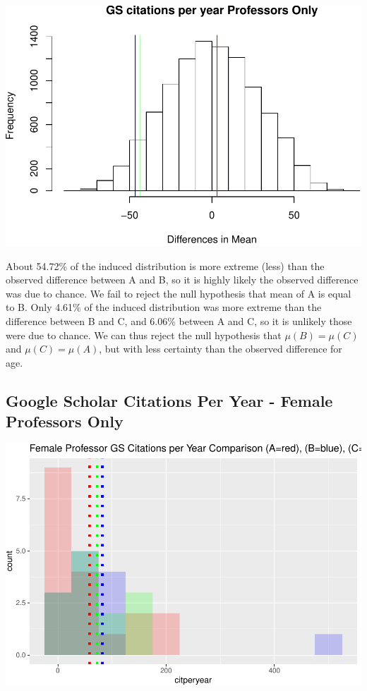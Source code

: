 \documentclass[]{article}
\begin{document}
\includegraphics{final_files/figure-latex/unnamed-chunk-69-1.pdf}

About 54.72\% of the induced distribution is more extreme (less) than
the observed difference between A and B, so it is highly likely the
observed difference was due to chance. We fail to reject the null
hypothesis that mean of A is equal to B. Only 4.61\% of the induced
distribution was more extreme than the difference between B and C, and
6.06\% between A and C, so it is unlikely those were due to chance. We
can thus reject the null hypothesis that \(\mu(B)=\mu(C)\) and
\(\mu(C)=\mu(A)\), but with less certainty than the observed difference
for age.

\hypertarget{google-scholar-citations-per-year---female-professors-only}{%
\subsection{Google Scholar Citations Per Year - Female Professors
Only}\label{google-scholar-citations-per-year---female-professors-only}}

\includegraphics{final_files/figure-latex/unnamed-chunk-71-1.pdf}
\end{document}
